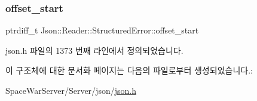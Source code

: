 \mbox{\label{struct_json_1_1_reader_1_1_structured_error_ac98af0da2d704be4b64a9572a682423b}} 
\subsubsection{\texorpdfstring{offset\+\_\+start}{offset\_start}}
{\footnotesize\ttfamily ptrdiff\+\_\+t Json\+::\+Reader\+::\+Structured\+Error\+::offset\+\_\+start}



json.\+h 파일의 1373 번째 라인에서 정의되었습니다.



이 구조체에 대한 문서화 페이지는 다음의 파일로부터 생성되었습니다.\+:\begin{DoxyCompactItemize}
\item 
Space\+War\+Server/\+Server/json/\hyperlink{json_8h}{json.\+h}\end{DoxyCompactItemize}
